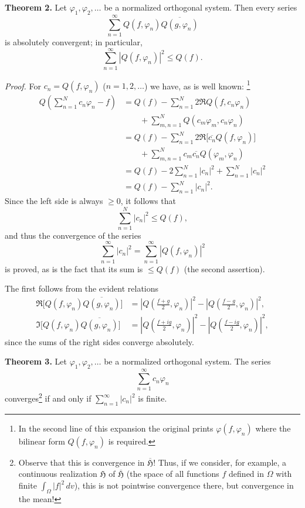 \documentclass[fontsize=13pt,paper=b5,twoside,bookmarkpackage=false]{scrartcl}
\newcounter{translatornote}
\newcommand{\tnote}[1]{%
  \begingroup\stepcounter{translatornote}%
  \renewcommand{\thefootnote}{T\arabic{translatornote}}%
  \footnote[0]{#1}\endgroup}
\begin{document}
\par\medskip\noindent\textbf{Theorem 2.}\label{thm:VI:2}
Let $\varphi_1,\varphi_2,\ldots$ be a normalized orthogonal system. Then every series
\[
\sum_{n=1}^{\infty}Q(f,\varphi_n)\overline{Q(g,\varphi_n)}
\]
is absolutely convergent; in particular,
\[
\sum_{n=1}^{\infty}|Q(f,\varphi_n)|^2\le Q(f).
\]

\par\noindent\textit{Proof.}
For $c_n=Q(f,\varphi_n)$ ($n=1,2,\ldots$) we have, as is well known:\tnote{In the second line of this expansion the original prints $\varphi(f,\varphi_n)$ where the bilinear form $Q(f,\varphi_n)$ is required.}
\begin{align*}
Q\!\left(\sum_{n=1}^{N}c_n\varphi_n-f\right)
&=Q(f)-\sum_{n=1}^{N}2\Re Q(f,c_n\varphi_n)\\
&\qquad+\sum_{m,n=1}^{N}Q(c_m\varphi_m,c_n\varphi_n)\\
&=Q(f)-\sum_{n=1}^{N}2\Re\bigl[\overline{c_n}Q(f,\varphi_n)\bigr]\\
&\qquad+\sum_{m,n=1}^{N}c_m\overline{c_n}Q(\varphi_m,\varphi_n)\\
&=Q(f)-2\sum_{n=1}^{N}|c_n|^2+\sum_{n=1}^{N}|c_n|^2\\
&=Q(f)-\sum_{n=1}^{N}|c_n|^2.
\end{align*}
Since the left side is always $\ge0$, it follows that
\[
\sum_{n=1}^{N}|c_n|^2\le Q(f),
\]
and thus the convergence of the series
\[
\sum_{n=1}^{\infty}|c_n|^2=\sum_{n=1}^{\infty}|Q(f,\varphi_n)|^2
\]
is proved, as is the fact that its sum is $\le Q(f)$ (the second assertion).

The first follows from the evident relations
\begin{align*}
\Re\bigl[Q(f,\varphi_n)\overline{Q(g,\varphi_n)}\bigr]
&=\left|Q\!\left(\frac{f+g}{2},\varphi_n\right)\right|^2
-\left|Q\!\left(\frac{f-g}{2},\varphi_n\right)\right|^2,\\
\Im\bigl[Q(f,\varphi_n)\overline{Q(g,\varphi_n)}\bigr]
&=\left|Q\!\left(\frac{f+ig}{2},\varphi_n\right)\right|^2
-\left|Q\!\left(\frac{f-ig}{2},\varphi_n\right)\right|^2,
\end{align*}
since the sums of the right sides converge absolutely.

\par\medskip\noindent\textbf{Theorem 3.}\label{thm:VI:3}
Let $\varphi_1,\varphi_2,\ldots$ be a normalized orthogonal system. The series
\[
\sum_{n=1}^{\infty}c_n\varphi_n
\]
converges\footnote[19]{\label{fn:19}Observe that this is convergence in $\overline{\mathfrak{H}}$! Thus, if we consider, for example, a continuous realization $\mathfrak{H}$ of $\overline{\mathfrak{H}}$ (the space of all functions $f$ defined in $\Omega$ with finite $\int_\Omega|f|^2\,dv$), this is not pointwise convergence there, but convergence in the mean!} if and only if $\sum_{n=1}^{\infty}|c_n|^2$ is finite.
\end{document}

